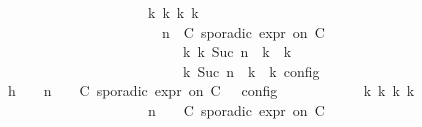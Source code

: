 \begin{isabellebody}
\ \ \ \ \ \ \ \ \ \ \ \ \ \ \ \ \ \ \ \ {\isasymLongrightarrow}\ {\isasymexists}{\isasymGamma}\isactrlsub k\ {\isasymPsi}\isactrlsub k\ {\isasymPhi}\isactrlsub k\ k{\isachardot}\isanewline
\ \ \ \ \ \ \ \ \ \ \ \ \ \ \ \ \ \ \ \ \ \ {\isacharparenleft}{\isacharparenleft}{\isasymGamma}{\isacharcomma}\ n\ {\isasymturnstile}\ {\isacharparenleft}{\isacharparenleft}C\ sporadic{\isasymsharp}\ {\isasymtau}\isactrlsub e\isactrlsub x\isactrlsub p\isactrlsub r\ on\ C\ {\isacharhash}\ {\isasymPsi}{\isacharparenright}\ {\isasymtriangleright}\ {\isasymPhi}{\isacharparenright}\isanewline
\ \ \ \ \ \ \ \ \ \ \ \ \ \ \ \ \ \ \ \ \ \ \ \ \ \ {\isasymhookrightarrow}\isactrlbsup k\isactrlesup \ {\isacharparenleft}{\isasymGamma}\isactrlsub k{\isacharcomma}\ Suc\ n\ {\isasymturnstile}\ {\isasymPsi}\isactrlsub k\ {\isasymtriangleright}\ {\isasymPhi}\isactrlsub k{\isacharparenright}{\isacharparenright}\isanewline
\ \ \ \ \ \ \ \ \ \ \ \ \ \ \ \ \ \ \ \ \ \ {\isasymand}\ {\isasymrho}\ {\isasymin}\ {\isasymlbrakk}\ {\isasymGamma}\isactrlsub k{\isacharcomma}\ Suc\ n\ {\isasymturnstile}\ {\isasymPsi}\isactrlsub k\ {\isasymtriangleright}\ {\isasymPhi}\isactrlsub k\ {\isasymrbrakk}\isactrlsub c\isactrlsub o\isactrlsub n\isactrlsub f\isactrlsub i\isactrlsub g{\isacartoucheclose}\isanewline
\ \ \ \ \ \ \ \ \isamarkupfalse%
\ {\isacharminus}\isanewline
\ \ \ \ \ \ \ \ \ \ \isamarkupfalse%
\ h{\isacharcolon}{\isacartoucheopen}{\isasymrho}\ {\isasymin}\ {\isasymlbrakk}\ {\isasymGamma}{\isacharcomma}\ n\ {\isasymturnstile}\ {\isasymPsi}\ {\isasymtriangleright}\ {\isacharparenleft}{\isacharparenleft}C\ sporadic{\isasymsharp}\ {\isasymtau}\isactrlsub e\isactrlsub x\isactrlsub p\isactrlsub r\ on\ C\ {\isacharhash}\ {\isasymPhi}{\isacharparenright}\ {\isasymrbrakk}\isactrlsub c\isactrlsub o\isactrlsub n\isactrlsub f\isactrlsub i\isactrlsub g{\isacartoucheclose}\isanewline
\ \ \ \ \ \ \ \ \ \ \isamarkupfalse%
\ {\isacartoucheopen}{\isasymexists}{\isasymGamma}\isactrlsub k\ {\isasymPsi}\isactrlsub k\ {\isasymPhi}\isactrlsub k\ k{\isachardot}\isanewline
\ \ \ \ \ \ \ \ \ \ \ \ \ \ \ \ \ \ \ \ {\isacharparenleft}{\isacharparenleft}{\isasymGamma}{\isacharcomma}\ n\ {\isasymturnstile}\ {\isasymPsi}\ {\isasymtriangleright}\ {\isacharparenleft}{\isacharparenleft}C\ sporadic{\isasymsharp}\ {\isasymtau}\isactrlsub e\isactrlsub x\isactrlsub p\isactrlsub r\ on\ C\ {\isacharhash}\ {\isasymPhi}{\isacharparenright}{\isacharparenright}\isanewline

\end{isabellebody}
